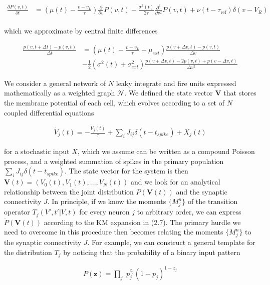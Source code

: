 \documentclass{ucetd}
\begin{document}
\begin{align*}
\frac{\partial P(v,t)}{\partial t} &= \left(\mu(t) - \frac{v-v_{L}}{\tau}\right) \frac{\partial}{\partial v} P(v,t) - \frac{\sigma^{2}(t)}{2\tau}\frac{\partial^{2}}{\partial v^{2}} P(v,t) + \nu(t-\tau_{\mathrm{ref}})\delta(v-V_{R})\\
\end{align*} 


which we approximate by central finite differences

\begin{align*}
\frac{p(v, t+\Delta t) - p(v,t)}{\Delta t} &= \left(\mu(t) - \frac{v-v_{L}}{\tau}+ \mu_{ext}\right)\frac{p(v+\Delta v, t) - p(v,t)}{\Delta v} \\
&- \frac{1}{2}\left(\sigma^{2}(t) + \sigma_{ext}^{2}\right)\frac{p(v+\Delta v, t) - 2p(v,t) + p(v-\Delta v, t)}{\Delta v^{2}}
\end{align*} 

We consider a general network of $N$ leaky integrate and fire units expressed mathematically as a weighted graph $\mathcal{N}$. We defined the state vector $\mathbf{V}$ that stores the membrane potential of each cell, which evolves according to a set of $N$ coupled differential equations

\begin{align*}
\dot{V_{j}}(t) = -\frac{V_{j}(t)}{\tau} + \sum_{i}J_{ij}\delta(t-t_{spike}) + X_{j}(t)
\end{align*}

for a stochastic input $X$, which we assume can be written as a compound Poisson process, and a weighted summation of spikes in the primary population $\sum_{i}J_{ij}\delta(t-t_{spike})$. The state vector for the system is then $\mathbf{V}(t) = (V_{0}(t), V_{1}(t), ..., V_{N}(t))$ and we look for an analytical relationship between the joint distribution $P(\mathbf{V}(t))$ and the synaptic connectivity $J$. In principle, if we know the moments $\{M_{j}^{n}\}$  of the transition operator $T_{j}(V',t'|V,t)$ for every neuron $j$ to arbitrary order, we can express $\dot{P}(\mathbf{V}(t))$ according to the KM expansion in (2.7). The primary hurdle we need to overcome in this procedure then becomes relating the moments $\{M_{j}^{n}\}$ to the synaptic connectivity $J$. For example, we can construct a general template for the distribution $T_{j}$ by noticing that the probability of a binary input pattern

\begin{align*}
P(\mathbf{z}) = \underset{j}{\prod} \; p_{j}^{z_{j}}(1-p_{j})^{1-z_{j}}
\end{align*}
\end{document}

